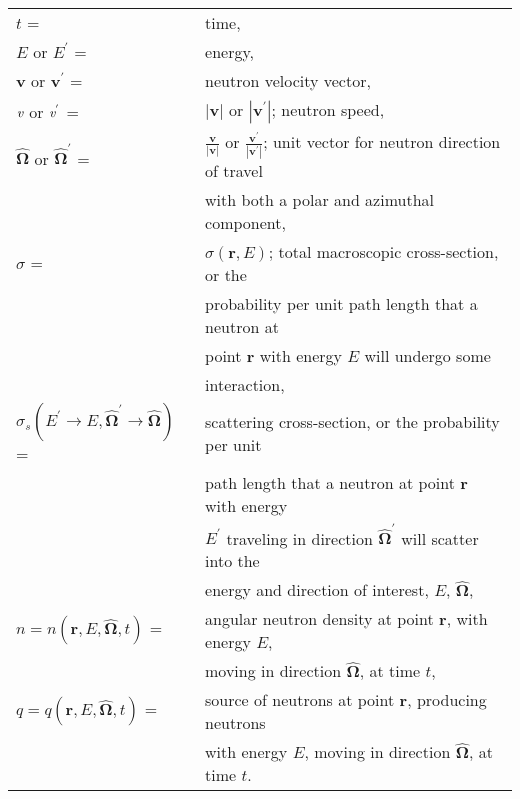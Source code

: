 	\begin{tabular}{ll}
		${t}$ \hfill = & time,  \vspace{10pt} \\
		${E}$ or ${E}^{'}$ \hfill = & energy, \vspace{10pt} \\
		$\mathbf{v}$ or $\mathbf{v}^{'}$ \hfill = & neutron velocity vector,  \vspace{10pt} \\
		$\emph{v}$ or $\emph{v}^{'}$ \hfill = & ${|\mathbf{v}|}$ or ${|\mathbf{v}^{'}|}$; neutron speed, 
			\vspace{10pt} \\
		$\mathbf{\hat{\Omega}}$ or $\mathbf{\hat{\Omega}} ^{'}$ \hfill = & 
			$\frac{\mathbf{v}}{|\mathbf{v}|}$ or $\frac{\mathbf{v}^{'}}{|\mathbf{v}^{'}|}$; unit vector 
			for neutron direction of travel \\ & with both a  polar and azimuthal component,
			\vspace{10pt} \\
		$\sigma$ \hfill = & $\sigma(\mathbf{r},E)$; total macroscopic cross-section, or the
			\\ & probability per unit path length that a neutron at \\&
			point $\mathbf{r}$ with energy $E$ will undergo some \\&
			interaction, \vspace{10pt} \\
		$\sigma_s({E}^{'}\rightarrow{E},\mathbf{\hat{\Omega}}^{'}
			\rightarrow\mathbf{\hat{\Omega}})$ \hfill = & 
			scattering cross-section, or the probability per unit \\& path length that a neutron at
			point $\mathbf{r}$ with energy \\& ${E}^{'}$ traveling in direction
			$\mathbf{\hat{\Omega}}^{'}$ will scatter into the \\& energy and direction of
			interest, ${E}$,  $\mathbf{\hat{\Omega}}$, \vspace{10pt} \\
		${n}={n(\mathbf{r},E,\mathbf{\hat{\Omega}},t)}$ \hfill = & angular neutron density at point
		$\mathbf{r}$, with energy ${E}$, \\& moving in direction $\mathbf{\hat{\Omega}}$,  at
		time ${t}$, \vspace{10pt} \\
		${q}={q(\mathbf{r},E,\mathbf{\hat{\Omega}},t)}$ \hfill = & source of neutrons at point
		$\mathbf{r}$, producing neutrons \\ & with energy ${E}$, moving in direction
		$\mathbf{\hat{\Omega}}$,  at time ${t}$. \vspace{10pt} \\
	\end{tabular} \vspace{10pt} \\

